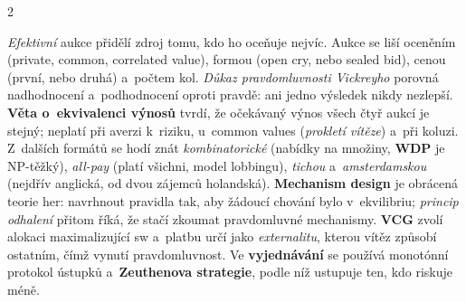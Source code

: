 \documentclass[10pt,a4paper]{article}
\newcommand{\hh}[1]{\par\smallskip\noindent{\bfseries\color{headcol}#1}\par\nobreak\vspace{-0.2em}}
\newcommand{\tm}[1]{\textbf{#1}}
\begin{document}
\begin{multicols}{2}
\hh{Aukce a~návrh mechanismů}
\emph{Efektivní} aukce přidělí zdroj tomu, kdo ho oceňuje nejvíc. Aukce se liší oceněním
(private, common, correlated value), formou (open cry, nebo sealed bid), cenou (první, nebo
druhá) a~počtem kol.
\emph{Důkaz pravdomluvnosti Vickreyho} porovná nadhodnocení a~podhodnocení oproti pravdě: ani
jedno výsledek nikdy nezlepší.
\tm{Věta o~ekvivalenci výnosů} tvrdí, že očekávaný výnos všech čtyř aukcí je stejný; neplatí
při averzi k~riziku, u~common values (\emph{prokletí vítěze}) a~při koluzi.
Z~dalších formátů se hodí znát \emph{kombinatorické} (nabídky na množiny, \tm{WDP} je
NP-těžký), \emph{all-pay} (platí všichni, model lobbingu), \emph{tichou} a~\emph{amsterdamskou}
(nejdřív anglická, od dvou zájemců holandská).
\tm{Mechanism design} je obrácená teorie her: navrhnout pravidla tak, aby žádoucí chování bylo
v~ekvilibriu; \emph{princip odhalení} přitom říká, že stačí zkoumat pravdomluvné mechanismy.
\tm{VCG} zvolí alokaci maximalizující sw a~platbu určí jako \emph{externalitu}, kterou vítěz
způsobí ostatním, čímž vynutí pravdomluvnost.
Ve \tm{vyjednávání} se používá monotónní protokol ústupků a~\tm{Zeuthenova strategie}, podle
níž ustupuje ten, kdo riskuje méně.

\end{multicols}
\newpage
\end{document}
